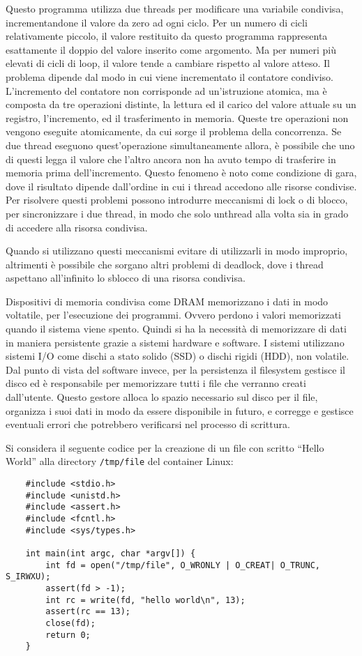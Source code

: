 \documentclass{article}
\numberwithin{equation}{subsection}
\begin{document}
Questo programma utilizza due threads per modificare una variabile condivisa, incrementandone il valore da zero ad ogni ciclo. 
Per un numero di cicli relativamente piccolo, il valore restituito da questo programma rappresenta esattamente il doppio del valore inserito 
come argomento. Ma per numeri più elevati di cicli di loop, il valore tende a cambiare rispetto al valore atteso. 
Il problema dipende dal modo in cui viene incrementato il contatore condiviso. L'incremento del contatore non corrisponde ad un'istruzione 
atomica, ma è composta da tre operazioni distinte, la lettura ed il carico del valore attuale su un registro, l'incremento, ed il trasferimento in 
memoria. Queste tre operazioni non vengono eseguite atomicamente, da cui sorge il problema della concorrenza. Se due thread eseguono quest'operazione 
simultaneamente allora, è possibile che uno di questi legga il valore che l'altro ancora non ha avuto tempo di trasferire in memoria prima dell'incremento. 
Questo fenomeno è noto come condizione di gara, dove il risultato dipende dall'ordine in cui i thread accedono alle risorse condivise. Per risolvere questi problemi 
possono introdurre meccanismi di lock o di blocco, per sincronizzare i due thread, in modo che solo unthread alla volta sia in grado di accedere alla risorsa condivisa. 

Quando si utilizzano questi meccanismi evitare di utilizzarli in modo improprio, altrimenti è possibile che sorgano altri problemi di deadlock, dove i thread 
aspettano all'infinito lo sblocco di una risorsa condivisa. 


Dispositivi di memoria condivisa come DRAM memorizzano i dati in modo voltatile, per l'esecuzione dei programmi. Ovvero perdono i valori memorizzati quando il sistema 
viene spento. Quindi si ha la necessità di memorizzare di dati in maniera persistente grazie a sistemi hardware e software. I sistemi utilizzano sistemi I/O come 
dischi a stato solido (SSD) o dischi rigidi (HDD), non volatile. Dal punto di vista del software invece, per la persistenza il filesystem gestisce il disco ed è 
responsabile per memorizzare tutti i file che verranno creati dall'utente. Questo gestore alloca lo spazio necessario sul disco per il file, organizza i suoi dati in modo 
da essere disponibile in futuro, e corregge e gestisce eventuali errori che potrebbero verificarsi nel processo di scrittura. 

Si considera il seguente codice per la creazione di un file con scritto ``Hello World'' alla directory \verb|/tmp/file| del container Linux:
\begin{verbatim}
    #include <stdio.h>
    #include <unistd.h>
    #include <assert.h>
    #include <fcntl.h>
    #include <sys/types.h>

    int main(int argc, char *argv[]) {
        int fd = open("/tmp/file", O_WRONLY | O_CREAT| O_TRUNC, S_IRWXU);
        assert(fd > -1);
        int rc = write(fd, "hello world\n", 13);
        assert(rc == 13);
        close(fd);
        return 0;
    }
\end{verbatim}
\end{document}
